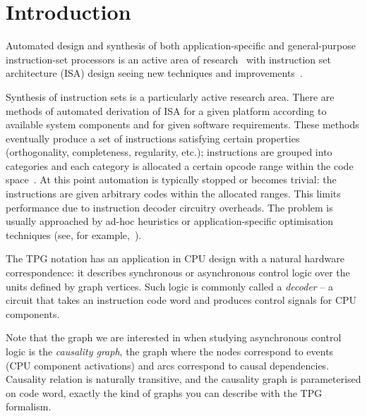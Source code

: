 \section{Introduction\label{sec:PGEncoding-intro}}

Automated design and synthesis of both application-specific and general-purpose
instruction-set processors is an active area of research~\cite{2006_dutt_chapter}
with instruction set architecture (ISA) design seeing new techniques and improvements~\cite{2002_qin_date}.


Synthesis of instruction sets is a particularly active research area.
There are methods of automated derivation of ISA for a given platform
according to available system components
and for given software requirements. These methods eventually produce a
set of instructions satisfying certain properties (orthogonality,
completeness, regularity, etc.); instructions are grouped into categories
and each category is allocated a certain opcode range within the
code space~\cite{2003_nohl_dac}. At this point automation is typically
stopped or becomes trivial: the instructions are given arbitrary codes
within the allocated ranges. This limits performance due to instruction
decoder circuitry overheads. The problem is usually approached by
ad-hoc heuristics or application-specific optimisation techniques
(see, for example,~\cite{2002_lee_iccad}).

The TPG notation has an application in CPU design with a natural hardware correspondence: it describes synchronous or asynchronous control logic over the units defined by graph vertices. Such logic is commonly called a \emph{decoder} -- a circuit that takes an instruction code word and produces control signals for CPU components.

Note that the graph we are interested in when studying asynchronous control logic is the \emph{causality graph}, the graph where the nodes correspond to events (CPU component activations) and arcs correspond to causal dependencies. Causality relation is naturally transitive, and the causality graph is parameterised on code word, exactly the kind of graphs you can describe with the TPG formalism.

